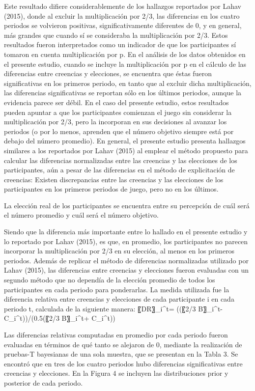 Este resultado difiere considerablemente de los hallazgos reportados por Lahav (2015), donde al excluir la multiplicación por 2/3, las diferencias en los cuatro periodos se volvieron positivas, significativamente diferentes de 0, y en general,  más grandes que cuando sí se consideraba la multiplicación por 2/3. Estos resultados fueron interpretados como un indicador de que los participantes sí tomaron en cuenta multiplicación por p.
En el análisis de los datos obtenidos en el presente estudio, cuando se incluye la multiplicación por p en el cálculo de las diferencias entre creencias y elecciones, se encuentra que éstas fueron significativas en los primeros periodo, en tanto que  al excluir dicha multiplicación, las diferencias significativas se reportan sólo en los últimos periodos, aunque la evidencia parece ser débil. En el caso del presente estudio, estos resultados pueden apuntar a que los participantes comienzan el juego sin considerar la multiplicación por 2/3, pero la incorporan en sus decisiones al avanzar los periodos (o por lo menos, aprenden que el número objetivo siempre está por debajo del número promedio).
En general, el presente estudio presenta hallazgos similares a los reportados por Lahav (2015) al emplear el método propuesto para calcular las diferencias normalizadas entre las creencias y las elecciones de los participantes, aún a pesar de las diferencias en el método de explicitación de creencias: 
	Existen discrepancias entre las creencias y las elecciones de los participantes en los primeros periodos de juego, pero no en los últimos.

	La elección real de los participantes se encuentra entre su percepción de cuál será el número promedio y cuál será el número objetivo.

Siendo que la diferencia más importante entre lo hallado en el presente estudio y lo reportado por Lahav (2015), es que, en promedio, los participantes no parecen incorporar la multiplicación por 2/3 en su elección, al menos en los primeros periodos.
Además de replicar el método de diferencias normalizadas utilizado por Lahav (2015), las diferencias entre creencias y elecciones fueron evaluadas con un segundo método que no dependía de la elección promedio de todos los participantes en cada periodo para ponderarlas. La medida utilizada fue la diferencia relativa entre creencias y elecciones de cada participante i en cada periodo t, calculada de la siguiente manera:
〖DR〗_i^t=  ((〖2/3 B〗_i^t- C_i^t))/(0.5(〖2/3 B〗_i^t+ C_i^t))

Las diferencias relativas computadas en promedio por cada periodo fueron evaluadas en términos de qué tanto se alejaron de 0, mediante la realización de pruebas-T bayesianas de una sola muestra, que se presentan en la Tabla 3. Se encontró que en tres de los cuatro periodos hubo diferencias significativas entre creencias y elecciones. En la Figura 4 se incluyen las distribuciones prior y posterior de cada periodo.





